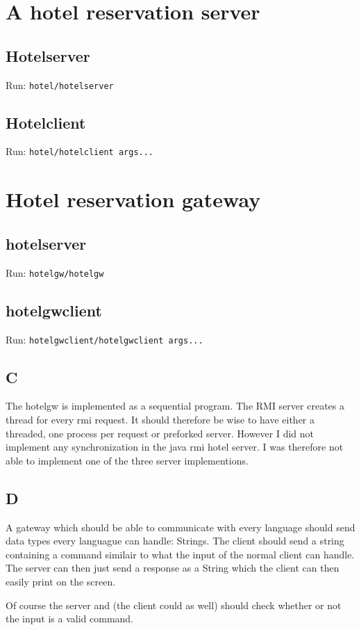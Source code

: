 \documentclass[10pt,a4paper]{article}
\begin{document}
\section{A hotel reservation server}
\subsection{Hotelserver}
Run: \texttt{hotel/hotelserver}

\subsection{Hotelclient}
Run: \texttt{hotel/hotelclient args...}


\section{Hotel reservation gateway}
\subsection{hotelserver}
Run: \texttt{hotelgw/hotelgw}

\subsection{hotelgwclient}
Run: \texttt{hotelgwclient/hotelgwclient args...}

\subsection{C}
The hotelgw is implemented as a sequential program. The RMI server creates a thread for every rmi request. It should therefore be wise to have either a threaded, one process per request or preforked server. However I did not implement any synchronization in the java rmi hotel server. I was therefore not able to implement one of the three server implementions.

\subsection{D}
A gateway which should be able to communicate with every language should send data types every languague can handle: Strings. The client should send a string containing a command similair to what the input of the normal client can handle. The server can then just send a response as a String which the client can then easily print on the screen.

Of course the server and (the client could as well) should check whether or not the input is a valid command.
\end{document}
